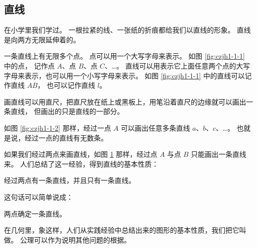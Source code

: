 \subsection{直线}\label{subsec:czjh1-1-1}

在小学里我们学过。 一根拉紧的线、一张纸的折痕都给我们以直线的形象。
直线是向两方无限延伸着的。

一条直线上有无限多个点。 点可以用一个大写字母来表示。
如图 \ref{fig:czjh1-1-1} 中的点， 记作点 $A$、点 $B$、点 $C$、…。
直线可以用表示它上面任意两个点的大写字母来表示，也可以用一个小写字母来表示。
如图 \ref{fig:czjh1-1-1} 中的直线可以记作直线 $AB$， 也可以记作直线 $l$。


\begin{figure}[htbp]
    \centering
    \begin{minipage}[b]{4cm}
        \centering
        
        \caption{}\label{fig:czjh1-1-1}
    \end{minipage}
    \qquad
    \begin{minipage}[b]{4cm}
        \centering
        
        \caption{}\label{fig:czjh1-1-2}
    \end{minipage}
    \qquad
    \begin{minipage}[b]{4cm}
        \centering
        
        \caption{}\label{fig:czjh1-1-3}
    \end{minipage}
\end{figure}

画直线可以用直尺，把直尺放在纸上或黑板上，用笔沿着直尺的边缘就可以画出一条直线，
但画出的只是直线的一部分。

如图 \ref{fig:czjh1-1-2} 那样，经过一点 $A$ 可以画出任意多条直线 $a$、$b$、$c$、…。
也就是说，经过一点的直线有无数条。

如果我们经过两点来画直线，如图 \ref{fig:czjh1-1-3} 那样，经过点 $A$ 与点 $B$ 只能画出一条直线来。
人们总结了这一经验，得到直线的基本性质：

\begin{xingzhi}
    经过两点有一条直线，并且只有一条直线。
\end{xingzhi}

这句话可以简单说成：\begin{xingzhi}
    两点确定一条直线。
\end{xingzhi}

在几何里，象这样，人们从实践经验中总结出来的图形的基本性质，我们把它叫做。
公理可以作为说明其他问题的根据。

